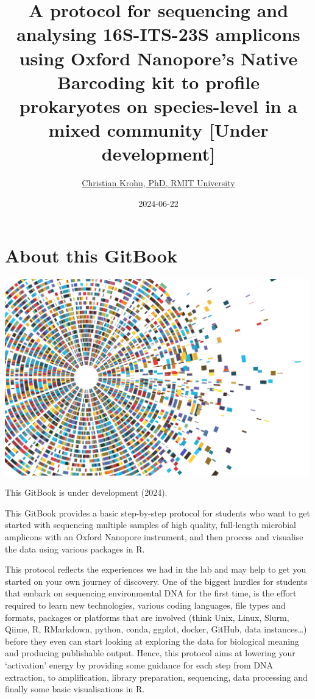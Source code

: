 \documentclass[
]{book}
\title{A protocol for sequencing and analysing 16S-ITS-23S amplicons using Oxford Nanopore's Native Barcoding kit to profile prokaryotes on species-level in a mixed community {[}Under development{]}}
\author{\href{https://www.rmit.edu.au/contact/staff-contacts/academic-staff/k/krohn---christian}{Christian Krohn, PhD, RMIT University}}
\date{2024-06-22}
\begin{document}
\maketitle

{
\setcounter{tocdepth}{1}
\tableofcontents
}
\chapter{About this GitBook}\label{about}

\includegraphics[width=5.20833in,height=\textheight]{./img/vectorstock_23650232.jpg}

This GitBook is under development (2024).

This GitBook provides a basic step-by-step protocol for students who want to get started with sequencing multiple samples of high quality, full-length microbial amplicons with an Oxford Nanopore instrument, and then process and visualise the data using various packages in R.

This protocol reflects the experiences we had in the lab and may help to get you started on your own journey of discovery. One of the biggest hurdles for students that embark on sequencing environmental DNA for the first time, is the effort required to learn new technologies, various coding languages, file types and formats, packages or platforms that are involved (think Unix, Linux, Slurm, Qiime, R, RMarkdown, python, conda, ggplot, docker, GitHub, data instances\ldots) before they even can start looking at exploring the data for biological meaning and producing publishable output. Hence, this protocol aims at lowering your `activation' energy by providing some guidance for each step from DNA extraction, to amplification, library preparation, sequencing, data processing and finally some basic visualisations in R.
\end{document}
